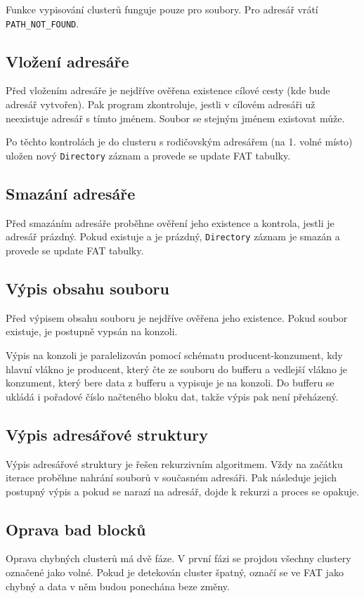 \documentclass[11pt,a4paper]{scrartcl}
\begin{document}
	Funkce vypisování clusterů funguje pouze pro soubory. Pro adresář vrátí \verb|PATH_NOT_FOUND|.
	
	\subsection{Vložení adresáře}
	Před vložením adresáře je nejdříve ověřena existence cílové cesty (kde bude adresář vytvořen). Pak program zkontroluje, jestli v cílovém adresáři už neexistuje adresář s tímto jménem. Soubor se stejným jménem existovat může.
	
	Po těchto kontrolách je do clusteru s rodičovským adresářem (na 1. volné místo) uložen nový \verb|Directory| záznam a provede se update FAT tabulky.
	
	\subsection{Smazání adresáře}
	Před smazáním adresáře proběhne ověření jeho existence a kontrola, jestli je adresář prázdný. Pokud existuje a je prázdný, \verb|Directory| záznam je smazán a provede se update FAT tabulky.
	
	\subsection{Výpis obsahu souboru}
	Před výpisem obsahu souboru je nejdříve ověřena jeho existence. Pokud soubor existuje, je postupně vypsán na konzoli.
	
	Výpis na konzoli je paralelizován pomocí schématu producent-konzument, kdy hlavní vlákno je producent, který čte ze souboru do bufferu a vedlejší vlákno je konzument, který bere data z bufferu a vypisuje je na konzoli. Do bufferu se ukládá i pořadové číslo načteného bloku dat, takže výpis pak není přeházený.
	
	\subsection{Výpis adresářové struktury}
	Výpis adresářové struktury je řešen rekurzivním algoritmem. Vždy na začátku iterace proběhne nahrání souborů v současném adresáři. Pak následuje jejich postupný výpis a pokud se narazí na adresář, dojde k rekurzi a proces se opakuje.
	
	\subsection{Oprava bad blocků}
	Oprava chybných clusterů má dvě fáze. V první fázi se projdou všechny clustery označené jako volné. Pokud je detekován cluster špatný, označí se ve FAT jako chybný a data v něm budou ponechána beze změny.
	
\end{document}
